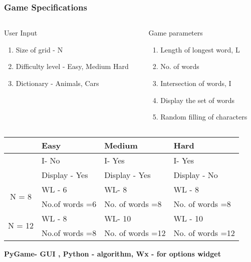 \documentclass[handout]{beamer}%
\begin{document}
\begin{frame}\frametitle{Game Specifications}
\begin{columns}[c]
\begin{column}{5cm}
\begin{block}{User Input }
\begin{enumerate}
\item Size of grid - N
\item Difficulty level - Easy, Medium Hard
\item Dictionary - Animals, Cars
\end{enumerate}
\end{block}
\end{column}
\pause
\begin{column}{5cm}
\begin{block}{Game parameters}
\begin{enumerate}
\item Length of longest word, L
\item No. of words
\item Intersection of words, I
\item Display the set of words  
\item Random filling of characters
\end{enumerate}
\end{block}
\end{column}
\end{columns}
\pause
\centering
\label{tablewc}
\resizebox{\columnwidth}{!}
{

\begin{tabular}{|c|l | l | l |}
\hline
 & Easy & Medium & Hard \\
\hline
  & I- No & I- Yes & I- Yes\\
& Display - Yes & Display - Yes & Display - No  \\ \hline
\multirow{2}{*}{N = 8}  & WL - 6 &  WL- 8 & WL - 8\\
& No.of words =6 & No. of words =8 & No. of words =8\\
\hline
\multirow{2}{*}{N = 12}  & WL - 8 &  WL- 10 & WL - 10\\
& No.of words =8 & No. of words =12 & No. of words =12\\
\hline
\end{tabular}
}
\vfill
\textbf{PyGame- GUI , Python - algorithm, Wx - for options widget}
\end{frame}
\end{document}
